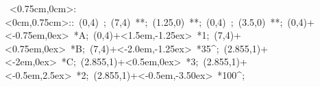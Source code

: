 
%

\hbox{
\xy    <0.75cm,0cm>:<0cm,0.75cm>::
       (0,4) ; (7,4) **\dir{-};
       (1.25,0) **\dir{-}; 
       (0,4) ; (3.5,0) **\dir{-};  
       (0,4)+<-0.75em,0ex> *{A};
       (0,4)+<1.5em,-1.25ex> *{1};
       (7,4)+<0.75em,0ex> *{B};
       (7,4)+<-2.0em,-1.25ex> *{35^\circ};
       (2.855,1)+<-2em,0ex> *{C};
       (2.855,1)+<0.5em,0ex> *{3};
       (2.855,1)+<-0.5em,2.5ex> *{2};
       (2.855,1)+<-0.5em,-3.50ex> *{100^\circ};
       \endxy}
	   
